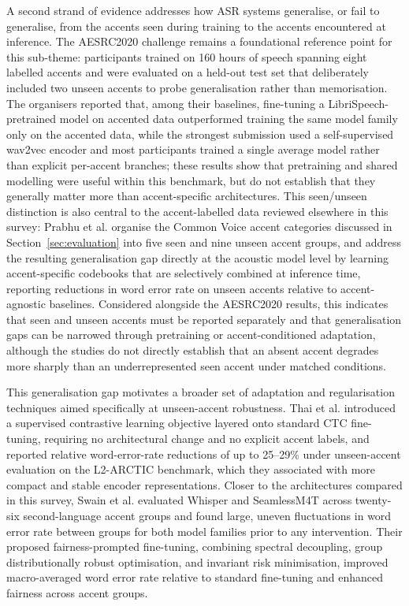 A second strand of evidence addresses how ASR systems generalise, or fail to
generalise, from the accents seen during training to the accents encountered at
inference. The AESRC2020 challenge \cite{shi2021aesrc} remains a foundational
reference point for this sub-theme: participants trained on 160 hours of speech
spanning eight labelled accents and were evaluated on a held-out test set that
deliberately included two unseen accents to probe generalisation rather than
memorisation. The organisers reported that, among their baselines, fine-tuning
a LibriSpeech-pretrained model on accented data outperformed training the same
model family only on the accented data, while the strongest submission used a
self-supervised wav2vec encoder and most participants trained a single average
model rather than explicit per-accent branches; these results show that
pretraining and shared modelling were useful within this benchmark, but do not
establish that they generally matter more than accent-specific architectures.
This seen/unseen distinction is also central to the accent-labelled data
reviewed elsewhere in this survey: Prabhu et al.
\cite{prabhu2023accentcodebooks} organise the Common Voice accent categories
discussed in Section~\ref{sec:evaluation} into five seen and nine unseen accent
groups, and address the resulting generalisation gap directly at the acoustic
model level by learning accent-specific codebooks that are selectively combined
at inference time, reporting reductions in word error rate on unseen accents
relative to accent-agnostic baselines. Considered alongside the AESRC2020
results, this indicates that seen and unseen accents must be reported
separately and that generalisation gaps can be narrowed through pretraining or
accent-conditioned adaptation, although the studies do not directly establish
that an absent accent degrades more sharply than an underrepresented seen
accent under matched conditions.

This generalisation gap motivates a broader set of adaptation and
regularisation techniques aimed specifically at unseen-accent robustness. Thai
et al. \cite{thai2026contrastive} introduced a supervised contrastive learning
objective layered onto standard CTC fine-tuning, requiring no architectural
change and no explicit accent labels, and reported relative word-error-rate
reductions of up to 25--29\% under unseen-accent evaluation on the L2-ARCTIC
benchmark, which they associated with more compact and stable encoder
representations. Closer to the architectures compared in this survey, Swain et
al. \cite{swain2026fair} evaluated Whisper and SeamlessM4T across twenty-six
second-language accent groups and found large, uneven fluctuations in word
error rate between groups for both model families prior to any intervention.
Their proposed fairness-prompted fine-tuning, combining spectral decoupling,
group distributionally robust optimisation, and invariant risk minimisation,
improved macro-averaged word error rate relative to standard fine-tuning and
enhanced fairness across accent groups.

